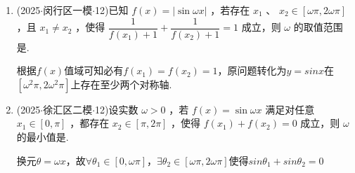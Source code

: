 \begin{enumerate}
\begin{jieda}
        
        因此$\omega  = 7$ 或 $15$.
    \end{jieda}

    \item (2025$\cdot$闵行区一模$\cdot$12)已知 $f\left( x\right)  = \left| {\sin {\omega x}}\right|$ ，若存在 ${x}_{1}$ 、 ${x}_{2} \in  \left\lbrack  {{\omega \pi },{2\omega \pi }}\right\rbrack$ ，且 ${x}_{1} \neq  {x}_{2}$ ，使得 $\dfrac{1}{f\left( {x}_{1}\right)  + 1} + \dfrac{1}{f\left( {x}_{2}\right)  + 1} = 1$ 成立，则 $\omega$ 的取值范围是.
    \begin{jieda}
        根据$f(x)$值域可知必有$f(x_1) = f(x_2) = 1$，原问题转化为$y = sinx$在$[\omega^2\pi, 2\omega^2\pi]$上存在至少两个对称轴.
    \end{jieda}
    \item (2025$\cdot$徐汇区二模$\cdot$12)设实数 $\omega  > 0$ ，若 $f\left( x\right)  = \sin {\omega x}$ 满足对任意 ${x}_{1} \in  \left\lbrack  {0,\pi }\right\rbrack$ ，都存在 ${x}_{2} \in  \left\lbrack  {\pi ,{2\pi }}\right\rbrack$ ，使得 $f\left( {x}_{1}\right)  + f\left( {x}_{2}\right)  = 0$ 成立，则 $\omega$ 的最小值是.
    \begin{jieda}
        换元$\theta = \omega x$，故$\forall \theta_1 \in [0, \omega\pi]$，$\exists \theta_2 \in [\omega\pi, 2\omega\pi]$使得$sin\theta_1 + sin\theta_2 = 0$


\end{jieda}
\end{enumerate}

